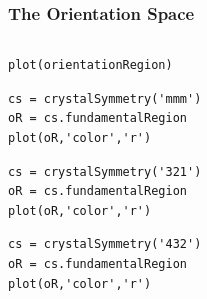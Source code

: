 \documentclass[compress]{beamer}
\begin{document}
\begin{frame}[fragile]
  \frametitle{The Orientation Space}

  \begin{columns}
    \begin{column}{0.55\textwidth}

      \begin{lstlisting}[style=input]
plot(orientationRegion)
      \end{lstlisting}

      \pause

      \vspace{-0.1cm}
      \begin{lstlisting}[style=input]
cs = crystalSymmetry('mmm')
oR = cs.fundamentalRegion
plot(oR,'color','r')
\end{lstlisting}

\pause

\vspace{-0.1cm}
      \begin{lstlisting}[style=input]
cs = crystalSymmetry('321')
oR = cs.fundamentalRegion
plot(oR,'color','r')
\end{lstlisting}

\pause

\vspace{-0.1cm}
      \begin{lstlisting}[style=input]
cs = crystalSymmetry('432')
oR = cs.fundamentalRegion
plot(oR,'color','r')
      \end{lstlisting}


\end{column}
\end{columns}
\end{frame}
\end{document}
